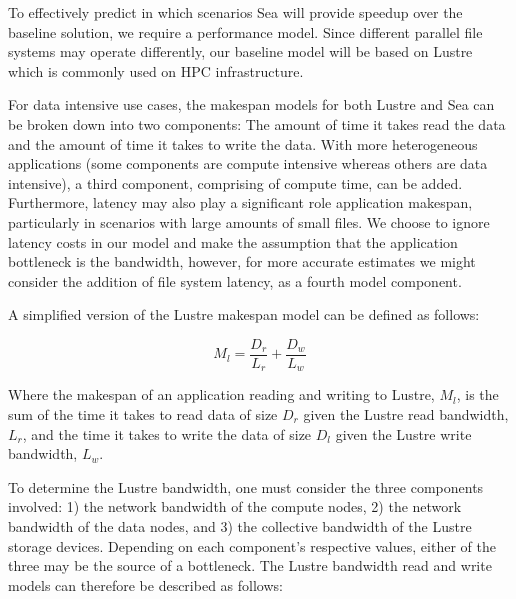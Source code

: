       To effectively predict in which scenarios Sea will provide
      speedup over the baseline solution, we require a performance model. Since different
      parallel file systems may operate differently, our baseline model will be
      based on Lustre which is commonly used on HPC infrastructure.

      For data intensive use cases, the makespan models for both Lustre and Sea
      can be broken down into two components: The amount of time it takes read
      the data and the amount of time it takes to write the data. With more
      heterogeneous applications (some components are compute intensive whereas
      others are data intensive), a third component, comprising of compute time,
      can be added. Furthermore, latency may also play a significant role
      application makespan, particularly in scenarios with large amounts of
      small files. We choose to ignore latency costs in our model and make the
      assumption that the application bottleneck is the bandwidth, however, for
      more accurate estimates we might consider the addition of file system
      latency, as a fourth model component.

      A simplified version of the Lustre makespan model can be defined as
      follows:

      \begin{equation}\label{eq:lustrenpc}
          M_{l} =  \frac{D_{r}}{L_{r}} + \frac{D_{w}}{L_{w}}
      \end{equation}

      Where the makespan of an application reading and writing to Lustre, $M_{l}$,
      is the sum of the time it takes to read data of size $D_{r}$ given the Lustre
      read bandwidth, $L_{r}$, and the time it takes to write the data of size $D_{l}$
      given the Lustre write bandwidth, $L_{w}$.


      To determine the Lustre bandwidth, one must consider the three components
  involved: 1) the network bandwidth of the compute nodes, 2) the network
  bandwidth of the data nodes, and 3) the collective bandwidth of the Lustre
  storage devices. Depending on each component's respective values, either of
  the three may be the source of a bottleneck. The Lustre bandwidth read and
  write models can therefore be described as follows:

